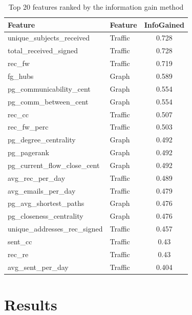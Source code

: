 \documentclass{article}
\begin{document}
\begin{table}[H]
\centering
\caption{Top 20 features ranked by the information gain method}
\label{tab:ranked_feats}
\begin{tabular}{|l|l|c|}
\hline
Feature                                & Feature      & InfoGained \\\hline
unique\_subjects\_received             & Traffic      & 0.728  \\
total\_received\_signed                & Traffic      & 0.728  \\
rec\_fw                                & Traffic      & 0.719  \\
fg\_hubs                               & Graph        & 0.589  \\
pg\_communicability\_cent              & Graph        & 0.554  \\
pg\_comm\_between\_cent                & Graph        & 0.554  \\
rec\_cc                                & Traffic      & 0.507  \\
rec\_fw\_perc                          & Traffic      & 0.503  \\
pg\_degree\_centrality                 & Graph        & 0.492  \\
pg\_pagerank                           & Graph        & 0.492  \\
pg\_current\_flow\_close\_cent         & Graph        & 0.492  \\
avg\_rec\_per\_day                     & Traffic      & 0.489  \\
avg\_emails\_per\_day                  & Traffic      & 0.479  \\
pg\_avg\_shortest\_paths               & Graph        & 0.476  \\
pg\_closeness\_centrality              & Graph        & 0.476  \\
unique\_addresses\_rec\_signed         & Traffic      & 0.457  \\
sent\_cc                               & Traffic      & 0.43   \\
rec\_re                                & Traffic      & 0.43   \\
avg\_sent\_per\_day                    & Traffic      & 0.404  \\ \hline
\end{tabular}
\end{table}


\section{Results} \label{Results}
\end{document}
